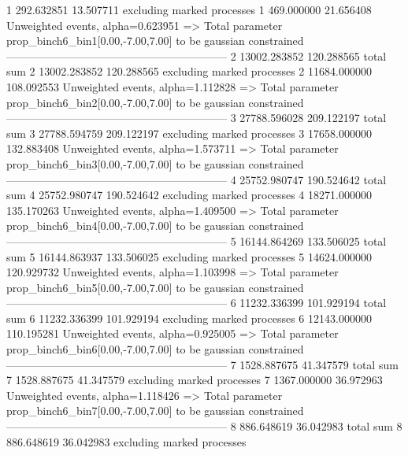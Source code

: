 1          292.632851      13.507711       excluding marked processes    
1          469.000000      21.656408       Unweighted events, alpha=0.623951
  => Total parameter prop_binch6_bin1[0.00,-7.00,7.00] to be gaussian constrained
------------------------------------------------------------
2          13002.283852    120.288565      total sum                     
2          13002.283852    120.288565      excluding marked processes    
2          11684.000000    108.092553      Unweighted events, alpha=1.112828
  => Total parameter prop_binch6_bin2[0.00,-7.00,7.00] to be gaussian constrained
------------------------------------------------------------
3          27788.596028    209.122197      total sum                     
3          27788.594759    209.122197      excluding marked processes    
3          17658.000000    132.883408      Unweighted events, alpha=1.573711
  => Total parameter prop_binch6_bin3[0.00,-7.00,7.00] to be gaussian constrained
------------------------------------------------------------
4          25752.980747    190.524642      total sum                     
4          25752.980747    190.524642      excluding marked processes    
4          18271.000000    135.170263      Unweighted events, alpha=1.409500
  => Total parameter prop_binch6_bin4[0.00,-7.00,7.00] to be gaussian constrained
------------------------------------------------------------
5          16144.864269    133.506025      total sum                     
5          16144.863937    133.506025      excluding marked processes    
5          14624.000000    120.929732      Unweighted events, alpha=1.103998
  => Total parameter prop_binch6_bin5[0.00,-7.00,7.00] to be gaussian constrained
------------------------------------------------------------
6          11232.336399    101.929194      total sum                     
6          11232.336399    101.929194      excluding marked processes    
6          12143.000000    110.195281      Unweighted events, alpha=0.925005
  => Total parameter prop_binch6_bin6[0.00,-7.00,7.00] to be gaussian constrained
------------------------------------------------------------
7          1528.887675     41.347579       total sum                     
7          1528.887675     41.347579       excluding marked processes    
7          1367.000000     36.972963       Unweighted events, alpha=1.118426
  => Total parameter prop_binch6_bin7[0.00,-7.00,7.00] to be gaussian constrained
------------------------------------------------------------
8          886.648619      36.042983       total sum                     
8          886.648619      36.042983       excluding marked processes    
